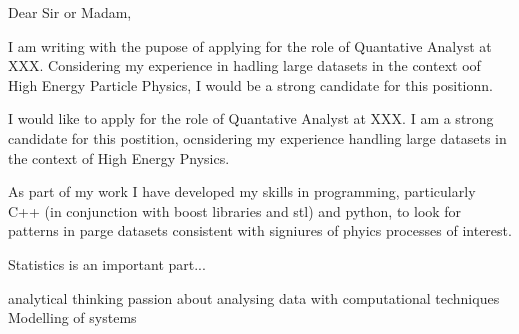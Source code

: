 

Dear Sir or Madam,

I am writing with the pupose of applying for the role of Quantative Analyst at XXX.
Considering my experience in hadling large datasets in the context oof High Energy Particle
Physics, I would be a strong candidate for this positionn.

I would like to apply for the role of Quantative Analyst at XXX.
I am a strong candidate for this postition, ocnsidering my experience handling large datasets in
the context of High Energy Pnysics.

As part of my work I have developed my skills in programming, particularly C++ (in conjunction
with boost libraries and stl) and python, to look
for patterns in parge datasets consistent with signiures of phyics processes of interest.

Statistics is an important part...


analytical thinking
passion about analysing data with computational techniques
Modelling of systems


